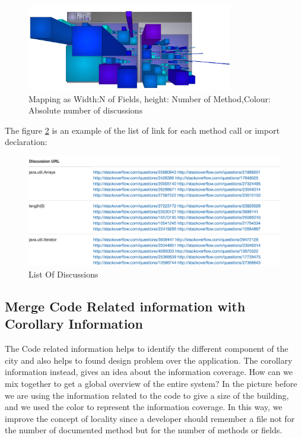 \documentclass[]{usiinfbachelorproject}
\begin{document}
\begin{figure}[H]
	\centering
	\includegraphics[width=0.8\textwidth]{images/discAbsLang}
	
	\caption[Discussion Mapping]{Mapping as Width:N of Fields, height: Number of Method,Colour: Absolute number of discussions\label{fig:disc}}

\end{figure}

The figure \ref{fig:list} is an example of  the list of link for each method call or import declaration:


 \begin{figure}[H]
	\centering
	\includegraphics[width=1\textwidth]{images/listOfDiscussions}
		\caption[List Of Discussions]{List Of Discussions \label{fig:list}
}

\end{figure}


\subsection{Merge Code Related information with Corollary Information}
The Code related information helps to identify the different component of the city and also helps to found design problem over the application. The corollary information instead, gives an idea about the information coverage. How can we mix together to get a global overview of the entire system? In the picture before we are using the information related to the code to give a size of the building, and we used the color to represent the information coverage. In this way, we improve the concept of locality since a developer should remember a file not for the number of documented method but for the number of methods or fields.
\end{document}
